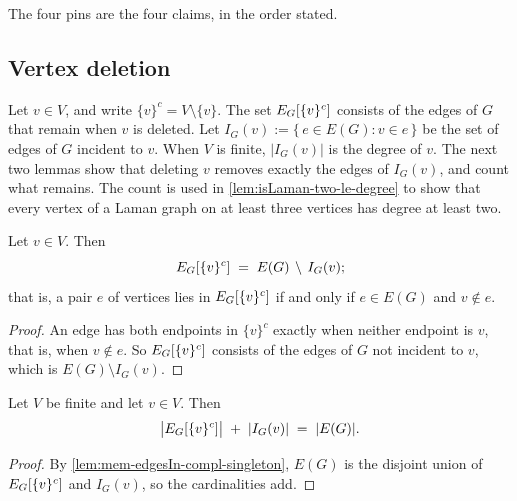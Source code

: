 \begin{fmlnote}
  The four pins are the four claims, in the order stated.
\end{fmlnote}

\subsection{Vertex deletion}

Let $v \in V$, and write $\{v\}^c = V \setminus \{v\}$. The set
$E_{G}[\{v\}^c]$ consists of the edges of $G$ that remain when $v$
is deleted. Let $I_G(v) := \{\,e \in E(G) : v \in e\,\}$ be the set of
edges of $G$ incident to $v$. When $V$ is finite, $|I_G(v)|$ is the
degree of $v$. The next two lemmas show that deleting $v$ removes
exactly the edges of $I_G(v)$, and count what remains. The count is
used in \cref{lem:isLaman-two-le-degree} to show that every vertex of a
Laman graph on at least three vertices has degree at least two.

\begin{lemma}
  \label{lem:mem-edgesIn-compl-singleton}
  \leanok
  Let $v \in V$. Then
  \[
    E_{G}[\{v\}^{c}] \;=\; E(G) \,\setminus\, I_G(v);
  \]
  that is, a pair $e$ of vertices lies in $E_{G}[\{v\}^c]$ if and
  only if $e \in E(G)$ and $v \notin e$.
\end{lemma}
\begin{proof}
  \leanok
  An edge has both endpoints in $\{v\}^c$ exactly when neither
  endpoint is $v$, that is, when $v \notin e$. So
  $E_{G}[\{v\}^c]$ consists of the edges of $G$ not incident to $v$,
  which is $E(G) \setminus I_G(v)$.
\end{proof}

\begin{lemma}
  \label{lem:ncard-edgesIn-compl-singleton}
  \leanok
  Let $V$ be finite and let $v \in V$. Then
  \[
    \bigl|E_{G}[\{v\}^{c}]\bigr| \;+\; |I_G(v)| \;=\; |E(G)|.
  \]
\end{lemma}
\begin{proof}
  \leanok
  By \cref{lem:mem-edgesIn-compl-singleton}, $E(G)$ is the disjoint
  union of $E_{G}[\{v\}^c]$ and $I_G(v)$, so the cardinalities add.
\end{proof}

